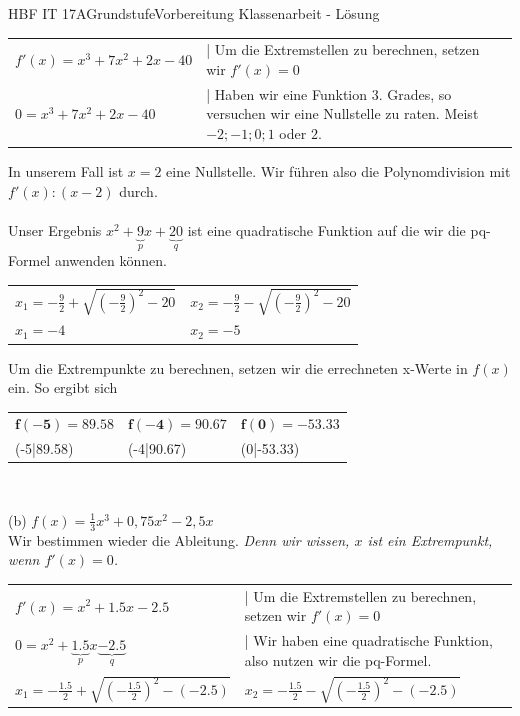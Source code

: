 \documentclass[oneside,openany,headings=optiontotoc,11pt,numbers=noenddot]{scrreprt}
\begin{document}
\begin{worksheet}{HBF IT 17A}{Grundstufe}{Vorbereitung Klassenarbeit - Lösung}
\begin{framed}
			\normalsize
			\begin{tabularx}{\textwidth}{XXX}
				\(f'(x) = x^3 +7x^2+2x-40\) & | Um die Extremstellen zu berechnen, setzen wir \(f'(x) = 0\)\\
				\(0 = x^3 +7x^2+2x-40\) & | Haben wir eine Funktion 3. Grades, so versuchen wir eine Nullstelle zu raten. Meist \(-2; -1; 0; 1\) oder \(2\).\\
			\end{tabularx}
			In unserem Fall ist \(x=2\) eine Nullstelle. Wir führen also die Polynomdivision mit \(f'(x):(x-2)\) durch.\\
			\\
			Unser Ergebnis \(x^2 +\underbrace{9}_{p}x +\underbrace{20}_{q}\) ist eine quadratische Funktion auf die wir die pq-Formel anwenden können.\\
			\begin{tabularx}{\textwidth}{X|X}
				\(x_1 = -\frac{9}{2} + \sqrt{(-\frac{9}{2})^2 -20}\) & \(x_2 = -\frac{9}{2} - \sqrt{(-\frac{9}{2})^2 -20}\)\\
				\(x_1 = -4\) & \(x_2 = -5\)
			\end{tabularx}
			Um die Extrempunkte zu berechnen, setzen wir die errechneten x-Werte in \(f(x)\) ein. So ergibt sich\\
			\begin{tabularx}{\textwidth}{XXX}
				\(\mathbf{f(-5)} = 89.58\) & \(\mathbf{f(-4)} = 90.67\) & \(\mathbf{f(0)}= -53.33\)\\
				(-5|89.58) & (-4|90.67) & (0|-53.33)
			\end{tabularx}\\
			\par\bigskip\noindent
			(b) \(f(x) = \frac{1}{3}x^3 +0,75x^2 -2,5x\)\\
			Wir bestimmen wieder die Ableitung. \small{\textit{Denn wir wissen, \(x\) ist ein Extrempunkt, wenn \(f'(x) = 0\).}}\\
			\normalsize
			\begin{tabularx}{\textwidth}{XX}
				\(f'(x) = x^2 +1.5x-2.5\) &| Um die Extremstellen zu berechnen, setzen wir \(f'(x) = 0\)\\
				\(0 = x^2 +\underbrace{1.5}_{p}x\underbrace{-2.5}_{q}\) & | Wir haben eine quadratische Funktion, also nutzen wir die pq-Formel.\\
				\multicolumn{1}{X|}{\(x_1 = -\frac{1.5}{2} + \sqrt{(-\frac{1.5}{2})^2 -(-2.5)}\)} & \multicolumn{1}{X}{\(x_2 = -\frac{1.5}{2} - \sqrt{(-\frac{1.5}{2})^2 - (-2.5)}\)}\\

\end{tabularx}
\end{framed}
\end{worksheet}
\end{document}
